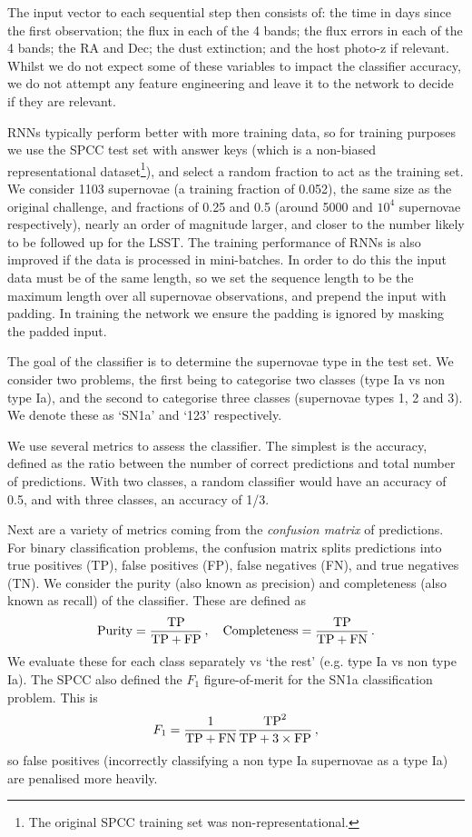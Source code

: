\documentclass[nofootinbib,amsmath,amssymb,10pt,eqsecnum, twocolumn]{revtex4-1}
\begin{document}
The input vector to each sequential step then consists of: the time in days since the first observation; the flux in each of the 4 bands; the flux errors in each of the 4 bands; the RA and Dec; the dust extinction; and the host photo-z if relevant. Whilst we do not expect some of these variables to impact the classifier accuracy, we do not attempt any feature engineering and leave it to the network to decide if they are relevant. 

RNNs typically perform better with more training data, so for training purposes we use the SPCC test set with answer keys (which is a non-biased representational dataset\footnote{The original SPCC training set was non-representational.}), and select a random fraction to act as the training set. We consider 1103 supernovae (a training fraction of 0.052), the same size as the original challenge, and fractions of 0.25 and 0.5 (around 5000 and $10^4$ supernovae respectively), nearly an order of magnitude larger, and closer to the number likely to be followed up for the LSST. The training performance of RNNs is also improved if the data is processed in mini-batches. In order to do this the input data must be of the same length, so we set the sequence length to be the maximum length over all supernovae observations, and prepend the input with padding. In training the network we ensure the padding is ignored by masking the padded input. 

The goal of the classifier is to determine the supernovae type in the test set. We consider two problems, the first being to categorise two classes (type Ia vs non type Ia), and the second to categorise three classes (supernovae types 1, 2 and 3). We denote these as  `SN1a' and  `123' respectively.  

We use several metrics to assess the classifier. The simplest is the accuracy, defined as the ratio between the number of correct predictions and total number of predictions. With two classes, a random classifier would have an accuracy of 0.5, and with three classes, an accuracy of 1/3.

Next are a variety of metrics coming from the {\em confusion matrix} of predictions.  For binary classification problems, the confusion matrix splits predictions into true positives (TP), false positives (FP),  false negatives (FN), and true negatives (TN). We consider the purity (also known as precision) and completeness (also known as recall) of the classifier. These are defined as 
\begin{equation}
{\rm Purity} = \frac{{\rm TP}}{{\rm TP}+{\rm FP}}\,, \quad {\rm Completeness} = \frac{{\rm TP}}{{\rm TP}+{\rm FN}}\,.
\end{equation}
We evaluate these for each class separately vs `the rest' (e.g. type Ia vs non type Ia). The SPCC also defined the $F_1$ figure-of-merit for the SN1a classification problem. This is 
\begin{equation}
F_1 = \frac{1}{{\rm TP}+{\rm FN}} \frac{{\rm TP}^2}{{\rm TP}+3 \times {\rm FP}}\,,
\end{equation}
so false positives (incorrectly classifying a non type Ia supernovae as a type Ia) are penalised more heavily.
\end{document}
